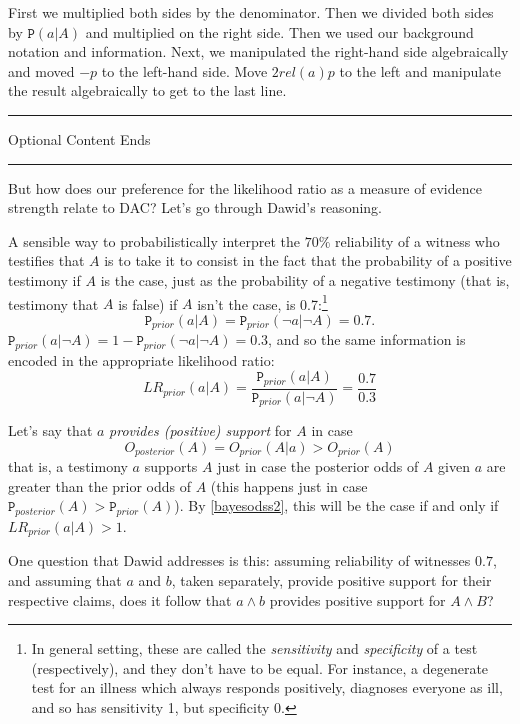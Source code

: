 \documentclass{ifcolog}
\newcommand{\intermezzob}{\nopagebreak 
	\begin{minipage}[c]{13cm}
	\begin{center}\rule{10cm}{0.4pt}

	\tiny{\sc Optional Content Ends}
	
	\vspace{-1mm}
	
	\rule{10cm}{0.4pt}\end{center}
	\end{minipage}
	}
\newcommand{\pr}[1]{\mbox{$\mathtt{P}(#1)$}}
\newcommand{\prr}[1]{\mbox{$\mathtt{P}_{prior}(#1)$}}
\newcommand{\prp}[1]{\mbox{$\mathtt{P}_{posterior}(#1)$}}
\newcommand{\n}{\neg}
\newcommand{\et}{\wedge}
\begin{document}
 First we multiplied both sides by the denominator. Then we divided both sides by $\pr{a\vert A}$ and multiplied on the right side. Then we used our background notation and information. Next, we manipulated the right-hand side algebraically and  moved  $-p$ to the left-hand side. Move $2rel(a)p$ to the left and manipulate the result algebraically to get to the last line.

\intermezzob


 But how does our preference for the likelihood ratio as a measure of evidence strength relate to DAC? Let's go through Dawid's reasoning. 

 A sensible  way to probabilistically interpret the  $70\%$ reliability of a witness who testifies that $A$  is to take it to consist in the fact that the probability of a positive testimony  if $A$ is the case, just as the probability of a negative testimony  (that is, testimony that $A$ is false) if $A$ isn't the case, is 0.7:\footnote{In general setting, these are called the \emph{sensitivity} and \emph{specificity} of a test (respectively), and they don't have to be equal. For instance, a degenerate test for an illness which always responds positively, diagnoses everyone as ill, and so has sensitivity 1, but specificity 0.} 
  \[\prr{a\vert A}=\prr{\n a\vert\n  A}=0.7.\]
 \noindent   $\prr{a\vert \n A}=1- \prr{\n a\vert \n A}=0.3$, and so the same information is encoded in the appropriate likelihood ratio:
 \[LR_{prior}(a\vert A )=\frac{\prr{a\vert A}}{\prr{a\vert \n A}}= \frac{0.7}{0.3}\] 


 Let's say that $a$ \emph{provides (positive) support} for $A$ in case 
 \[O_{posterior}(A)=O_{prior}(A\vert a)> O_{prior}(A)\]
 \noindent  that is, a testimony $a$ supports $A$ just in case the posterior odds of $A$ given $a$ are greater than the prior odds of $A$ (this happens just in case $\prp{A}>\prr{A}$). By \eqref{bayesodss2}, this will be the case if and only if $LR_{prior}(a\vert A)>1$.




 One question that Dawid addresses is this: assuming reliability of witnesses  $0.7$, and assuming that  $a$ and $b$, taken separately, provide positive support for their respective claims, does it follow that  $a \et b$ provides positive support for $A\et B$?
\end{document}
